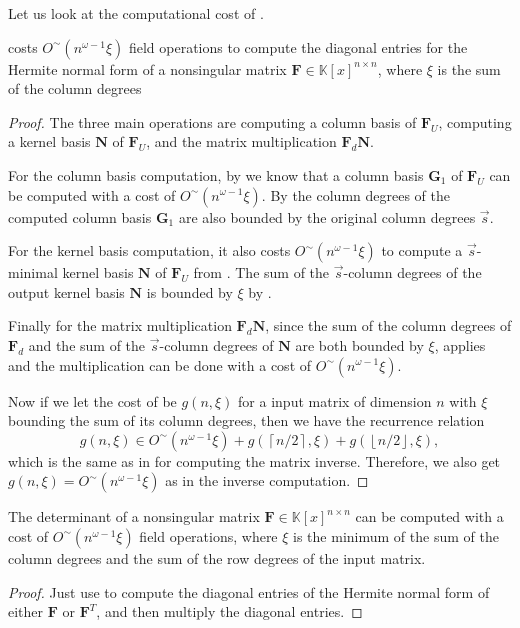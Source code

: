 Let us look at the computational cost of . 
\begin{thm}
 costs $O^{\sim}\left(n^{\omega-1}\xi\right)$
field operations to compute the diagonal entries for the Hermite normal
form of a nonsingular matrix $\mathbf{F}\in\mathbb{K}\left[x\right]^{n\times n}$,
where $\xi$ is the sum of the column degrees \end{thm}
\begin{proof}
The three main operations are computing a column basis of $\mathbf{F}_{U}$,
computing a kernel basis $\mathbf{N}$ of $\mathbf{F}_{U}$, and the
matrix multiplication $\mathbf{F}_{d}\mathbf{N}$.

For the column basis computation, by 
we know that a column basis $\mathbf{G}_{1}$ of $\mathbf{F}_{U}$
can be computed with a cost of $O^{\sim}\left(n^{\omega-1}\xi\right).$
By  the column degrees
of the computed column basis $\mathbf{G}_{1}$ are also bounded by
the original column degrees $\vec{s}$.

For the kernel basis computation, it also costs $O^{\sim}\left(n^{\omega-1}\xi\right)$
to compute a $\vec{s}$-minimal kernel basis $\mathbf{N}$ of $\mathbf{F}_{U}$
from . The sum of the $\vec{s}$-column
degrees of the output kernel basis $\mathbf{N}$ is bounded by $\xi$
by .

Finally for the matrix multiplication $\mathbf{F}_{d}\mathbf{N}$,
since the sum of the column degrees of $\mathbf{F}_{d}$ and the sum
of the $\vec{s}$-column degrees of $\mathbf{N}$ are both bounded
by $\xi$,  applies and
the multiplication can be done with a cost of $O^{\sim}\left(n^{\omega-1}\xi\right)$.

Now if we let the cost of  be $g(n,\xi)$
for a input matrix of dimension $n$ with $\xi$ bounding the sum
of its column degrees, then we have the recurrence relation
\[
g(n,\xi)\in O^{\sim}(n^{\omega-1}\xi)+g(\left\lceil n/2\right\rceil ,\xi)+g(\left\lfloor n/2\right\rfloor ,\xi),
\]
 which is the same as in  for computing
the matrix inverse. Therefore, we also get $g(n,\xi)=O^{\sim}(n^{\omega-1}\xi)$
as in the inverse computation.\end{proof}
\begin{cor}
The determinant of a nonsingular matrix $\mathbf{F}\in\mathbb{K}\left[x\right]^{n\times n}$
can be computed with a cost of $O^{\sim}(n^{\omega-1}\xi)$ field
operations, where $\xi$ is the minimum of the sum of the column degrees
and the sum of the row degrees of the input matrix.\end{cor}
\begin{proof}
Just use  to compute the diagonal
entries of the Hermite normal form of either $\mathbf{F}$ or $\mathbf{F}^{T}$,
and then multiply the diagonal entries.\end{proof}

